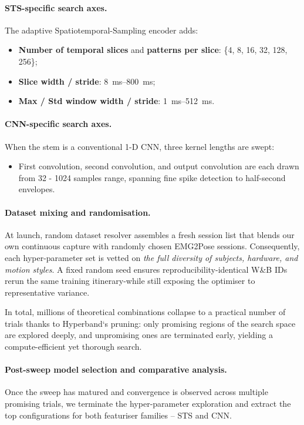 \paragraph{STS-specific search axes.}
The adaptive Spatiotemporal-Sampling encoder adds:

\begin{itemize}
  \item \textbf{Number of temporal slices} and \textbf{patterns per slice}:
        \{4, 8, 16, 32, 128, 256\};
  \item \textbf{Slice width / stride}: \SIrange{8}{800}{ms};
  \item \textbf{Max / Std window width / stride}:
        \SIrange{1}{512}{ms}.
\end{itemize}

\paragraph{CNN-specific search axes.}
When the stem is a conventional 1-D CNN, three kernel lengths are swept:

\begin{itemize}
  \item First convolution, second convolution, and output convolution are each
        drawn from 32 - 1024 samples range,
        spanning fine spike detection to half-second envelopes.
\end{itemize}

\paragraph{Dataset mixing and randomisation.}
At launch, random dataset resolver assembles a fresh session list that blends our own continuous capture with randomly chosen EMG2Pose sessions.
Consequently, each hyper-parameter set is vetted on \emph{the full diversity of subjects, hardware, and motion styles}.
A fixed random seed ensures reproducibility-identical W\&B IDs rerun the same training itinerary-while still exposing the optimiser to representative variance.

In total, millions of theoretical combinations collapse to a practical number of trials thanks to Hyperband`s pruning: only promising regions of the search space are explored deeply, and unpromising ones are terminated early, yielding a compute-efficient yet thorough search.

\paragraph{Post-sweep model selection and comparative analysis.}
Once the sweep has matured and convergence is observed across multiple promising trials, we terminate the hyper-parameter exploration and extract the top configurations for both featuriser families -- STS and CNN.

